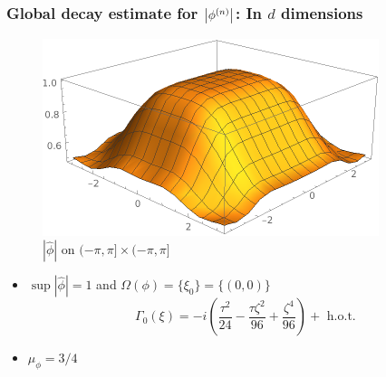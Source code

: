\documentclass{beamer}
\theoremstyle{definition}
\begin{document}
\begin{frame}
\frametitle{Global decay estimate for $\abs{\phi^{(n)}}$: In $d$ dimensions}

\begin{figure}
	\vspace{-10pt}
	\centering
	\includegraphics[scale=0.4]{d_dim_ex_1}
	\caption{$|\widehat{\phi}|$ on $(-\pi, \pi] \times (-\pi, \pi]$}
\end{figure}

\begin{itemize}
	\item $\sup|\widehat{\phi}| = 1$ and $\Omega(\phi)= \{\xi_0 \}  = \{ (0,0) \} $
	\begin{equation*}
	\Gamma_{0}(\xi)=-i\left(\frac{\tau^2}{24}-\frac{\tau\zeta^2}{96} +\frac{ \zeta^4}{96}\right) + \text{ h.o.t.}
	\end{equation*}
	
	\item $\mu_\phi = 3/4$
\end{itemize}
\end{frame}
\end{document}
